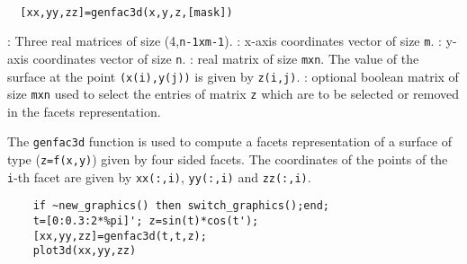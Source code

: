 
\begin{mandesc}
  \\ %
\end{mandesc}
\begin{calling_sequence}
\begin{verbatim}
  [xx,yy,zz]=genfac3d(x,y,z,[mask])
\end{verbatim}
\end{calling_sequence}

\begin{parameters}
  \begin{varlist}
    : Three real matrices of size (4,\verb!n-1xm-1!).
    : x-axis coordinates vector of size \verb!m!.
    : y-axis coordinates vector of size \verb!n!.
    : real matrix of size \verb!mxn!. The value of the surface at the point
    \verb!(x(i),y(j))! is given by \verb!z(i,j)!.
    : optional boolean matrix of size \verb!mxn! used to select the entries
    of matrix \verb!z! which are to be selected or removed in the facets representation.
  \end{varlist}
\end{parameters}

\begin{mandescription}
  The \verb!genfac3d! function is used to compute a facets representation of a surface of type
  (\verb!z=f(x,y)!)  given by four sided facets. The coordinates of the points of the \verb!i!-th facet are
  given by \verb!xx(:,i)!, \verb!yy(:,i)! and \verb!zz(:,i)!.
\end{mandescription}

\begin{examples}
  \begin{Verbatim}
    if ~new_graphics() then switch_graphics();end;
    t=[0:0.3:2*%pi]'; z=sin(t)*cos(t');
    [xx,yy,zz]=genfac3d(t,t,z);
    plot3d(xx,yy,zz)
  \end{Verbatim}
\end{examples}
\begin{manseealso}
   
\end{manseealso}
